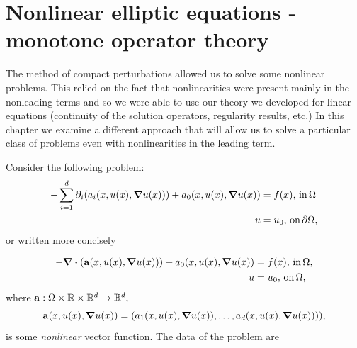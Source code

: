 \documentclass{article}
\begin{document}
\section{Nonlinear elliptic equations - monotone operator theory}
\label{sec:monotone_operator}

The method of compact perturbations allowed us to solve some nonlinear problems. This relied on the fact that nonlinearities were present mainly in the nonleading terms and so we were able to use our theory we developed for linear equations (continuity of the solution operators, regularity results, etc.) In this chapter we examine a different approach that will allow us to solve a particular class of problems even with nonlinearities in the leading term.

Consider the following problem:
\begin{align*}
	- \sum_{i=1}^d \partial_{i}\qty(a_i\qty(x,u(x),\grad u(x))) + a_0\qty(x,u(x),\grad u(x)) &= f(x), \, \text{in} \, \Omega \\
	u &= u_0,  \, \text{on} \, \partial \Omega,
\end{align*}
or written more concisely

\begin{align}
	\label{eq:nonlin_prob}
	- \divergence{\qty(\vb{a}\qty(x, u(x), \grad u(x)))} + a_0\qty(x, u(x), \grad u(x)) &= f(x), \, \text{in} \, \Omega, \\
	u &= u_0, \, \text{on} \, \Omega,
\end{align}
where $\vb{a}: \Omega \times {\mathbb R} \times {\mathbb R}^{d} \to {\mathbb R}^d,$
\[
	\vb{a}\qty(x, u(x), \grad u(x)) = \qty(a_1\qty(x, u(x), \grad u(x)), \dots, a_d\qty(x, u(x), \grad u(x)))),
\]
is some \textit{nonlinear} vector function. The data of the problem are
\end{document}
